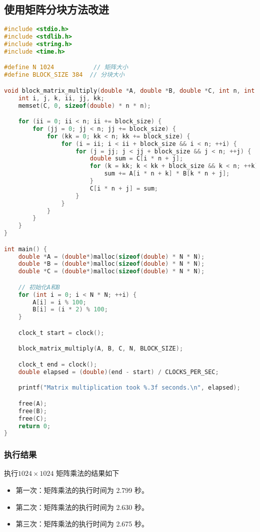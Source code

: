 \documentclass[a4paper,12pt]{ctexart}
\begin{document}
\subsection{使用矩阵分块方法改进}
\begin{lstlisting}[language=C, caption={矩阵分块C语言源码}]
#include <stdio.h>
#include <stdlib.h>
#include <string.h>
#include <time.h>

#define N 1024           // 矩阵大小
#define BLOCK_SIZE 384  // 分块大小

void block_matrix_multiply(double *A, double *B, double *C, int n, int block_size) {
    int i, j, k, ii, jj, kk;
    memset(C, 0, sizeof(double) * n * n);

    for (ii = 0; ii < n; ii += block_size) {
        for (jj = 0; jj < n; jj += block_size) {
            for (kk = 0; kk < n; kk += block_size) {
                for (i = ii; i < ii + block_size && i < n; ++i) {
                    for (j = jj; j < jj + block_size && j < n; ++j) {
                        double sum = C[i * n + j];
                        for (k = kk; k < kk + block_size && k < n; ++k) {
                            sum += A[i * n + k] * B[k * n + j];
                        }
                        C[i * n + j] = sum;
                    }
                }
            }
        }
    }
}

int main() {
    double *A = (double*)malloc(sizeof(double) * N * N);
    double *B = (double*)malloc(sizeof(double) * N * N);
    double *C = (double*)malloc(sizeof(double) * N * N);

    // 初始化A和B
    for (int i = 0; i < N * N; ++i) {
        A[i] = i % 100;
        B[i] = (i * 2) % 100;
    }

    clock_t start = clock();

    block_matrix_multiply(A, B, C, N, BLOCK_SIZE);

    clock_t end = clock();
    double elapsed = (double)(end - start) / CLOCKS_PER_SEC;

    printf("Matrix multiplication took %.3f seconds.\n", elapsed);

    free(A);
    free(B);
    free(C);
    return 0;
}
\end{lstlisting}

\subsubsection{执行结果}
执行$1024 \times 1024$ 矩阵乘法的结果如下
\begin{itemize}
    \item 第一次：矩阵乘法的执行时间为 2.799 秒。
    \item 第二次：矩阵乘法的执行时间为 2.630 秒。
    \item 第三次：矩阵乘法的执行时间为 2.675 秒。
\end{itemize}
\end{document}
